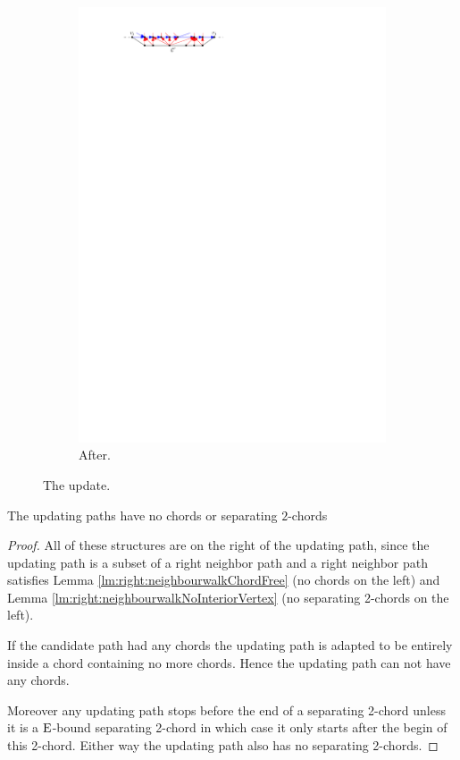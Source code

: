 \begin{figure}
\begin{subfigure}[b]{0.45 \textwidth}
          \includegraphics[width =\textwidth]{unifiedAlgo/img/sweep/updateAfter.pdf}
          \caption{After.}
      \end{subfigure}
      	\caption{The update.}
  \label{fig:sweep:update}
  \end{figure}


  \begin{lemma}
    The updating paths have no chords or separating $2$-chords
    \label{lm:sweep:augNoIregularity}
  \end{lemma}
  \begin{proof}
      All of these structures are on the right of the updating path, since the updating path is a subset of a right neighbor path and a right neighbor path satisfies Lemma \ref{lm:right:neighbourwalkChordFree} (no chords on the left) and Lemma \ref{lm:right:neighbourwalkNoInteriorVertex} (no separating 2-chords on the left).

      If the candidate path had any chords the updating path is adapted to be entirely inside a chord containing no more chords. Hence the updating path can not have any chords.

      Moreover any updating path stops before the end of a separating 2-chord unless it is a $\mathrm{E}$-bound separating 2-chord in which case it only starts after the begin of this 2-chord. Either way the updating path also has no separating 2-chords.
  \end{proof}

